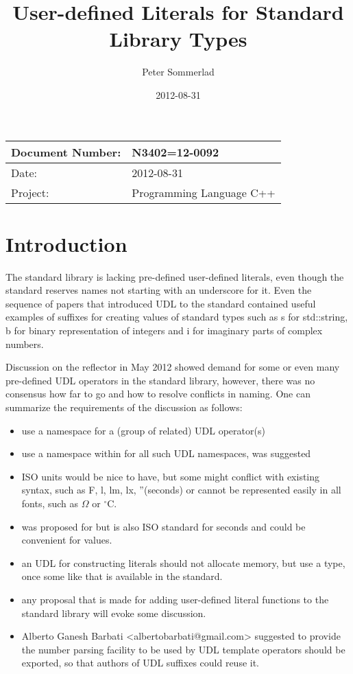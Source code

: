\documentclass[ebook,11pt,article]{memoir}
\title{User-defined Literals for Standard Library Types}
\author{Peter Sommerlad}
\date{2012-08-31}                                           %
\begin{document}
\maketitle
\begin{tabular}[t]{|l|l|}\hline 
Document Number: &  N3402=12-0092 \\\hline
Date: & 2012-08-31 \\\hline
Project: & Programming Language C++\\\hline 
\end{tabular}

\chapter{Introduction}
The standard library is lacking pre-defined user-defined literals, even though the standard reserves names not starting with an underscore for it. Even the sequence of papers that introduced UDL to the standard contained useful examples of suffixes for creating values of standard types such as s for std::string, b for binary representation of integers and i for imaginary parts of complex numbers.

Discussion on the reflector in May 2012 showed demand for some or even many pre-defined UDL operators in the standard library, however, there was no consensus how far to go and how to resolve conflicts in naming. One can summarize the requirements of the discussion as follows:
\begin{itemize}
\item use a namespace for a (group of related) UDL operator(s)
\item use a namespace within  for all such UDL namespaces,  was suggested
\item ISO units would be nice to have, but some might conflict with existing syntax, such as F, l, lm, lx, ''(seconds) or cannot be represented easily in all fonts, such as $\Omega$ or $^{\circ}\mathrm{C}$.
\item {} was proposed for  but is also ISO standard for seconds and could be convenient for  values.
\item an UDL for constructing  literals should not allocate memory, but use a  type, once some like that is available in the standard.
\item any proposal that is made for adding user-defined literal functions to the standard library will evoke some discussion.
\item Alberto Ganesh Barbati <albertobarbati@gmail.com> suggested to provide the number parsing facility to be used by UDL template operators should be exported, so that authors of UDL suffixes could reuse it.
\end{itemize}
\end{document}
